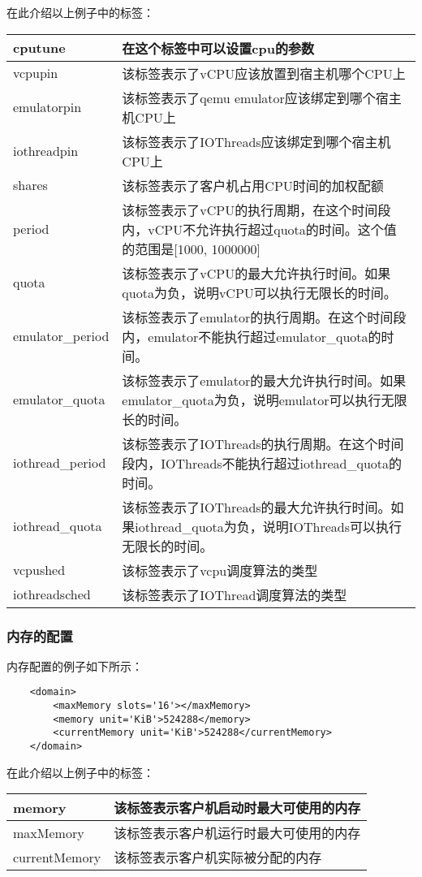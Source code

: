 \documentclass[a4paper,left=2.5cm,right=2.5cm,11pt]{article}
\newcommand{\interval}{\vspace{0.5em}}
\begin{document}
	在此介绍以上例子中的标签：
	\interval
	\begin{longtable}{p{2.5cm}p{11cm}}
	\hline
	cputune & 在这个标签中可以设置cpu的参数 \\
	\hline
	vcpupin & 该标签表示了vCPU应该放置到宿主机哪个CPU上 \\
	\hline
	emulatorpin & 该标签表示了qemu emulator应该绑定到哪个宿主机CPU上 \\
	\hline
	iothreadpin & 该标签表示了IOThreads应该绑定到哪个宿主机CPU上 \\
	\hline
	shares & 该标签表示了客户机占用CPU时间的加权配额 \\
	\hline
	period & 该标签表示了vCPU的执行周期，在这个时间段内，vCPU不允许执行超过quota的时间。这个值的范围是[1000, 1000000] \\
	\hline
	quota & 该标签表示了vCPU的最大允许执行时间。如果quota为负，说明vCPU可以执行无限长的时间。\\
	\hline
	emulator\_period & 该标签表示了emulator的执行周期。在这个时间段内，emulator不能执行超过emulator\_quota的时间。 \\
	\hline
	emulator\_quota & 该标签表示了emulator的最大允许执行时间。如果emulator\_quota为负，说明emulator可以执行无限长的时间。\\
	\hline
	iothread\_period & 该标签表示了IOThreads的执行周期。在这个时间段内，IOThreads不能执行超过iothread\_quota的时间。 \\
	\hline
	iothread\_quota & 该标签表示了IOThreads的最大允许执行时间。如果iothread\_quota为负，说明IOThreads可以执行无限长的时间。\\
	\hline
	vcpushed & 该标签表示了vcpu调度算法的类型 \\
	\hline
	iothreadsched & 该标签表示了IOThread调度算法的类型 \\
	\hline
	\end{longtable}

\subsubsection{内存的配置}
	内存配置的例子如下所示：
	\begin{lstlisting}
	<domain>
		<maxMemory slots='16'></maxMemory>
		<memory unit='KiB'>524288</memory>
		<currentMemory unit='KiB'>524288</currentMemory>
	</domain>
	\end{lstlisting}

	在此介绍以上例子中的标签：
	\interval
	\begin{longtable}{p{2.5cm}p{10cm}}
	\hline
	memory & 该标签表示客户机启动时最大可使用的内存 \\
	\hline
	maxMemory & 该标签表示客户机运行时最大可使用的内存 \\
	\hline
	currentMemory & 该标签表示客户机实际被分配的内存 \\
	\hline
	\end{longtable}
\end{document}

